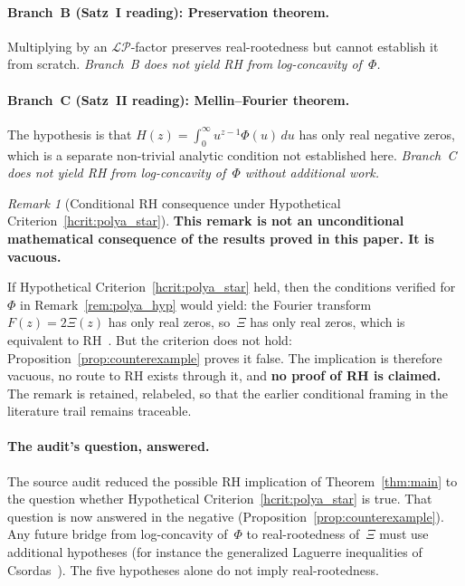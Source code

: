 \documentclass[11pt]{article}
\theoremstyle{definition}
\theoremstyle{remark}
\newtheorem{remark}[theorem]{Remark}
\begin{document}
\paragraph{Branch~B (Satz~I reading): Preservation theorem.}
Multiplying by an $\mathcal{LP}$-factor preserves real-rootedness but cannot
establish it from scratch.
\emph{Branch~B does not yield RH from log-concavity of~$\Phi$.}

\paragraph{Branch~C (Satz~II reading): Mellin--Fourier theorem.}
The hypothesis is that $H(z) = \int_0^\infty u^{z-1}\Phi(u)\,du$ has only real
negative zeros, which is a separate non-trivial analytic condition not established here.
\emph{Branch~C does not yield RH from log-concavity of~$\Phi$ without additional work.}

\begin{remark}[Conditional RH consequence under Hypothetical Criterion~\ref{hcrit:polya_star}]%
\label{thm:rh_conditional}
\textbf{This remark is not an unconditional mathematical consequence of the results
proved in this paper.  It is vacuous.}

If Hypothetical Criterion~\ref{hcrit:polya_star} held, then the
conditions verified for~$\Phi$ in Remark~\ref{rem:polya_hyp} would yield: the Fourier
transform $F(z) = 2\Xi(z)$ has only real zeros, so~$\Xi$ has only real zeros, which
is equivalent to RH~\cite{titchmarsh1986}.
But the criterion does not hold: Proposition~\ref{prop:counterexample}
proves it false.
The implication is therefore vacuous, no route to RH exists through it,
and \textbf{no proof of RH is claimed.}
The remark is retained, relabeled, so that the earlier conditional
framing in the literature trail remains traceable.
\end{remark}

\paragraph{The audit's question, answered.}
The source audit reduced the possible RH implication of Theorem~\ref{thm:main}
to the question whether Hypothetical Criterion~\ref{hcrit:polya_star} is true.
That question is now answered in the negative
(Proposition~\ref{prop:counterexample}).
Any future bridge from log-concavity of~$\Phi$ to real-rootedness
of~$\Xi$ must use additional hypotheses (for instance the generalized
Laguerre inequalities of Csordas~\cite{csordas2015}).
The five hypotheses alone do not imply real-rootedness.
\end{document}
